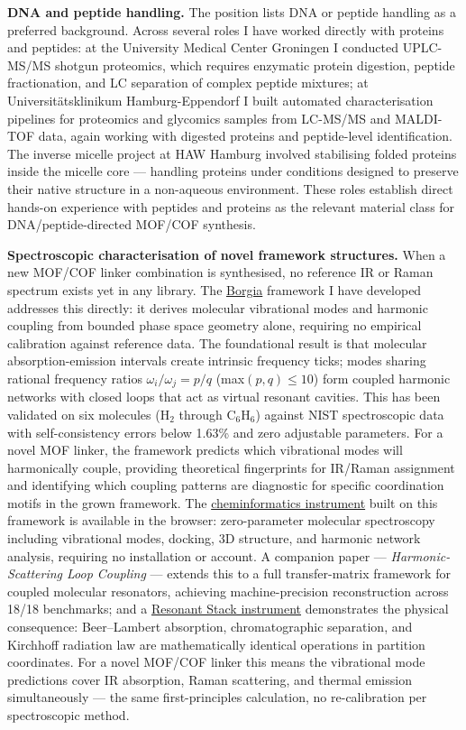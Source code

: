 \documentclass[12pt,a4paper]{article}
\begin{document}
\textbf{DNA and peptide handling.}
The position lists DNA or peptide handling as a preferred background.
Across several roles I have worked directly with proteins and peptides:
at the University Medical Center Groningen I conducted UPLC-MS/MS shotgun
proteomics, which requires enzymatic protein digestion, peptide fractionation,
and LC separation of complex peptide mixtures;
at Universitätsklinikum Hamburg-Eppendorf I built automated characterisation
pipelines for proteomics and glycomics samples from LC-MS/MS and MALDI-TOF
data, again working with digested proteins and peptide-level identification.
The inverse micelle project at HAW Hamburg involved stabilising folded
proteins inside the micelle core --- handling proteins under conditions
designed to preserve their native structure in a non-aqueous environment.
These roles establish direct hands-on experience with peptides and proteins
as the relevant material class for DNA/peptide-directed MOF/COF synthesis.

\textbf{Spectroscopic characterisation of novel framework structures.}
When a new MOF/COF linker combination is synthesised, no reference IR or
Raman spectrum exists yet in any library. The
\href{https://github.com/fullscreen-triangle/borgia}{Borgia} framework
I have developed addresses this directly: it derives molecular vibrational
modes and harmonic coupling from bounded phase space geometry alone,
requiring no empirical calibration against reference data.
The foundational result is that molecular absorption-emission intervals
create intrinsic frequency ticks; modes sharing rational frequency ratios
$\omega_i/\omega_j = p/q$ (max$(p,q) \leq 10$) form coupled harmonic networks
with closed loops that act as virtual resonant cavities.
This has been validated on six molecules (H$_2$ through C$_6$H$_6$) against
NIST spectroscopic data with self-consistency errors below 1.63\% and zero
adjustable parameters. For a novel MOF linker, the framework predicts which
vibrational modes will harmonically couple, providing theoretical fingerprints
for IR/Raman assignment and identifying which coupling patterns are diagnostic
for specific coordination motifs in the grown framework.
The \href{https://honjo-masamune.vercel.app/tools}{cheminformatics instrument}
built on this framework is available in the browser: zero-parameter
molecular spectroscopy including vibrational modes, docking, 3D structure,
and harmonic network analysis, requiring no installation or account.
A companion paper --- \textit{Harmonic-Scattering Loop Coupling} --- extends this
to a full transfer-matrix framework for coupled molecular resonators,
achieving machine-precision reconstruction across 18/18 benchmarks; and
a \href{https://space-observatory-xi.vercel.app/instruments/resonant-stack/}{Resonant Stack instrument}
demonstrates the physical consequence: Beer--Lambert absorption,
chromatographic separation, and Kirchhoff radiation law are mathematically
identical operations in partition coordinates.
For a novel MOF/COF linker this means the vibrational mode predictions cover
IR absorption, Raman scattering, and thermal emission simultaneously ---
the same first-principles calculation, no re-calibration per spectroscopic method.
\end{document}
